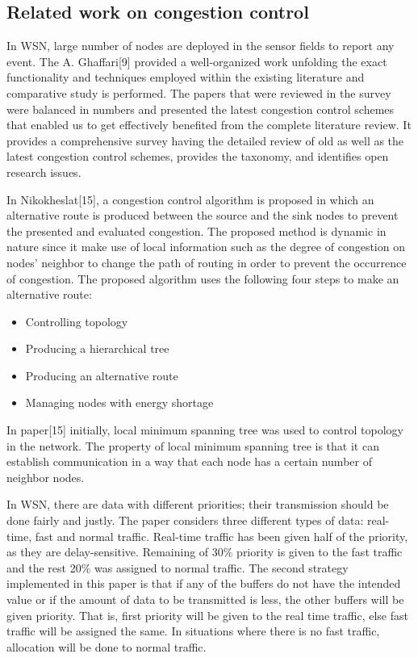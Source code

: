 \subsection{Related work on congestion control}
In WSN, large number of nodes are deployed in the sensor fields to report any event. The 
A. Ghaffari[9] provided a well-organized work unfolding the exact functionality and techniques employed within the existing literature and comparative study is performed. The papers that were reviewed in the survey were balanced in numbers and presented the latest congestion control schemes that enabled us to get effectively benefited from the complete literature review. It provides a comprehensive survey having the detailed review of old as well as the latest congestion control schemes, provides the taxonomy, and identifies open research issues.
\par 
In Nikokheslat[15], a congestion control algorithm is proposed in which an alternative route is
produced between the source and the sink nodes to prevent the presented and evaluated congestion. The proposed method is dynamic in nature since it make use of  local information such as the degree of congestion on nodes' neighbor to change the path of routing in order to prevent the occurrence of congestion. The proposed algorithm uses the following four steps to make an alternative route:
\begin{itemize}
    \item Controlling topology
    \item Producing a hierarchical tree
    \item Producing an alternative route
    \item Managing nodes with energy shortage
\end{itemize}
\par 
In paper[15] initially, local minimum spanning tree was used to control topology in the network. The property of local minimum spanning tree is that it can establish communication in a way that each node has a certain number of neighbor nodes. 
\par 
In WSN, there are data with different priorities; their transmission should be done fairly and justly. The paper considers three different types of data: real-time, fast and normal traffic. Real-time traffic has been given half of the priority, as they are delay-sensitive.  Remaining of 30\% priority is given to the fast traffic and the rest 20\% was assigned to normal traffic. The second strategy implemented in this paper is that if any of the buffers do not have the intended value or if the amount of data to be transmitted is less, the other buffers will be given priority. That is, first priority will be given to the real time traffic, else fast traffic will be assigned the same. In situations where there is no fast traffic,  allocation will be done to normal traffic.
